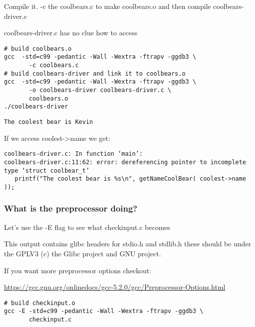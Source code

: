 \documentclass[11pt]{article}
\begin{document}
Compile it. -c the coolbears.c to make coolbears.o and then 
compile coolbears-driver.c

coolbears-driver.c has no clue how to access 

\begin{verbatim}
# build coolbears.o
gcc  -std=c99 -pedantic -Wall -Wextra -ftrapv -ggdb3 \
       -c coolbears.c
# build coolbears-driver and link it to coolbears.o
gcc  -std=c99 -pedantic -Wall -Wextra -ftrapv -ggdb3 \
       -o coolbears-driver coolbears-driver.c \
       coolbears.o 
./coolbears-driver
\end{verbatim}

\begin{verbatim}
The coolest bear is Kevin
\end{verbatim}

If we access coolest->name we get:

\begin{verbatim}
coolbears-driver.c: In function ‘main’:
coolbears-driver.c:11:62: error: dereferencing pointer to incomplete type ‘struct coolbear_t’
   printf("The coolest bear is %s\n", getNameCoolBear( coolest->name ));
\end{verbatim}


\subsubsection{What is the preprocessor doing?}
\label{sec:org03a0ca8}

Let's use the -E flag to see what checkinput.c becomes

This output contains glibc headers for stdio.h and stdlib.h these
should be under the GPLV3 (c) the Glibc project and GNU project.

If you want more preprocessor options checkout:

\url{https://gcc.gnu.org/onlinedocs/gcc-5.2.0/gcc/Preprocessor-Options.html}

\begin{verbatim}
# build checkinput.o
gcc -E -std=c99 -pedantic -Wall -Wextra -ftrapv -ggdb3 \
       checkinput.c
\end{verbatim}
\end{document}
